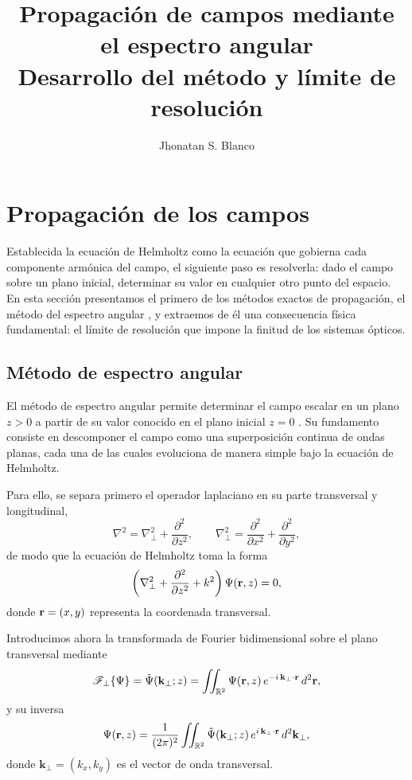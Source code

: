 \documentclass[12pt,a4paper]{article}
\title{Propagación de campos mediante el espectro angular\\
\large Desarrollo del método y límite de resolución}
\author{Jhonatan S. Blanco}
\date{}
\numberwithin{equation}{section}
\begin{document}
\maketitle
\tableofcontents

\section{Propagación de los campos}

Establecida la ecuación de Helmholtz como la ecuación que gobierna cada componente armónica del campo, el siguiente paso es resolverla: dado el campo sobre un plano inicial, determinar su valor en cualquier otro punto del espacio. En esta sección presentamos el primero de los métodos exactos de propagación, el método del espectro angular \cite{goodman2005}, y extraemos de él una consecuencia física fundamental: el límite de resolución que impone la finitud de los sistemas ópticos.

\subsection{Método de espectro angular}

El método de espectro angular permite determinar el campo escalar en un plano $z>0$ a partir de su valor conocido en el plano inicial $z=0$ \cite{goodman2005}. Su fundamento consiste en descomponer el campo como una superposición continua de ondas planas, cada una de las cuales evoluciona de manera simple bajo la ecuación de Helmholtz.

Para ello, se separa primero el operador laplaciano en su parte transversal y longitudinal,
\begin{equation}
\nabla^2
=
\nabla_\perp^2
+
\frac{\partial^2}{\partial z^2},
\qquad
\nabla_\perp^2
=
\frac{\partial^2}{\partial x^2}
+
\frac{\partial^2}{\partial y^2},
\label{eq:laplacian_transverse_longitudinal}
\end{equation}
de modo que la ecuación de Helmholtz toma la forma
\begin{equation}
\left(
\nabla_\perp^2
+
\frac{\partial^2}{\partial z^2}
+
k^2
\right)
\Psi(\vb r,z)
=
0,
\label{eq:helmholtz_split}
\end{equation}
donde $\vb r=(x,y)$ representa la coordenada transversal.

Introducimos ahora la transformada de Fourier bidimensional sobre el plano transversal mediante
\begin{equation}
\mathscr F_\perp\{\Psi\}
=
\tilde{\Psi}(\mathbf k_\perp;z)
=
\iint_{\mathbb R^2}
\Psi(\vb r,z)\,
e^{-i\,\mathbf k_\perp\cdot\vb r}
\,d^2\vb r,
\label{eq:fourier_forward}
\end{equation}
y su inversa
\begin{equation}
\Psi(\vb r,z)
=
\frac{1}{(2\pi)^2}
\iint_{\mathbb R^2}
\tilde{\Psi}(\mathbf k_\perp;z)\,
e^{i\,\mathbf k_\perp\cdot\vb r}
\,d^2\mathbf k_\perp,
\label{eq:fourier_inverse}
\end{equation}
donde $\mathbf k_\perp=(k_x,k_y)$ es el vector de onda transversal.
\end{document}
